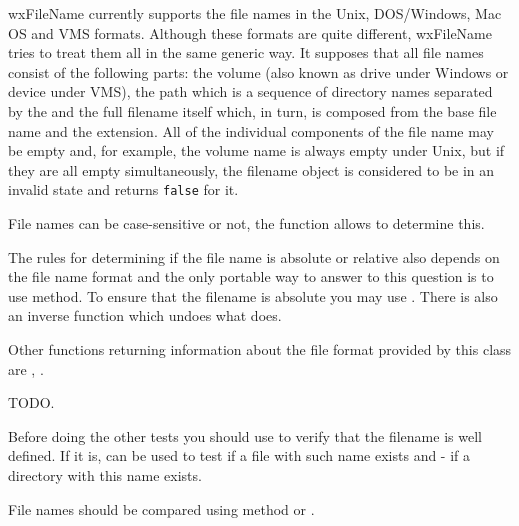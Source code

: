 wxFileName currently supports the file names in the Unix, DOS/Windows, Mac OS
and VMS formats. Although these formats are quite different, wxFileName tries
to treat them all in the same generic way. It supposes that all file names
consist of the following parts: the volume (also known as drive under Windows
or device under VMS), the path which is a sequence of directory names separated
by the  and the full
filename itself which, in turn, is composed from the base file name and the
extension. All of the individual components of the file name may be empty and,
for example, the volume name is always empty under Unix, but if they are all
empty simultaneously, the filename object is considered to be in an invalid
state and  returns {\tt false} for it.

File names can be case-sensitive or not, the function\rtfsp
{} allows to determine this.

The rules for determining if the file name is absolute or relative also depends
on the file name format and the only portable way to answer to this question is
to use  method. To ensure that the
filename is absolute you may use .
There is also an inverse function
 which undoes what
 does.

Other functions returning information about the file format provided by this
class are ,\rtfsp
{}.



TODO.


Before doing the other tests you should use  to
verify that the filename is well defined. If it is, 
 can be used to test if a file with
such name exists and  - if a directory
with this name exists.

File names should be compared using  method
or .

